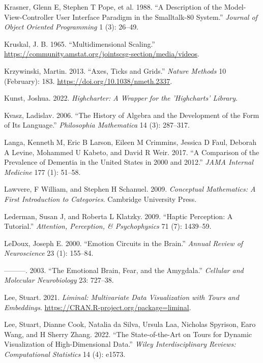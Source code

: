 \documentclass[
  openany]{book}
\newlength{\cslhangindent}
\newenvironment{CSLReferences}[2] %
 {\begin{list}{}{%
  \setlength{\itemindent}{0pt}
  \setlength{\leftmargin}{0pt}
  \setlength{\parsep}{0pt}
  \ifodd #1
   \setlength{\leftmargin}{\cslhangindent}
   \setlength{\itemindent}{-1\cslhangindent}
  \fi
  \setlength{\itemsep}{#2\baselineskip}}}
 {\end{list}}
\theoremstyle{definition}
\theoremstyle{definition}
\theoremstyle{definition}
\theoremstyle{definition}
\theoremstyle{remark}
\begin{document}
\begin{CSLReferences}{1}{0}
Krasner, Glenn E, Stephen T Pope, et al. 1988. {``A Description of the Model-View-Controller User Interface Paradigm in the Smalltalk-80 System.''} \emph{Journal of Object Oriented Programming} 1 (3): 26--49.

Kruskal, J. B. 1965. {``{Multidimensional Scaling}.''} \url{https://community.amstat.org/jointscsg-section/media/videos}.

Krzywinski, Martin. 2013. {``Axes, Ticks and Grids.''} \emph{Nature Methods} 10 (February): 183. \url{https://doi.org/10.1038/nmeth.2337}.

Kunst, Joshua. 2022. \emph{Highcharter: A Wrapper for the 'Highcharts' Library}.

Kvasz, Ladislav. 2006. {``The History of Algebra and the Development of the Form of Its Language.''} \emph{Philosophia Mathematica} 14 (3): 287--317.

Langa, Kenneth M, Eric B Larson, Eileen M Crimmins, Jessica D Faul, Deborah A Levine, Mohammed U Kabeto, and David R Weir. 2017. {``A Comparison of the Prevalence of Dementia in the United States in 2000 and 2012.''} \emph{JAMA Internal Medicine} 177 (1): 51--58.

Lawvere, F William, and Stephen H Schanuel. 2009. \emph{Conceptual Mathematics: A First Introduction to Categories}. Cambridge University Press.

Lederman, Susan J, and Roberta L Klatzky. 2009. {``Haptic Perception: A Tutorial.''} \emph{Attention, Perception, \& Psychophysics} 71 (7): 1439--59.

LeDoux, Joseph E. 2000. {``Emotion Circuits in the Brain.''} \emph{Annual Review of Neuroscience} 23 (1): 155--84.

---------. 2003. {``The Emotional Brain, Fear, and the Amygdala.''} \emph{Cellular and Molecular Neurobiology} 23: 727--38.

Lee, Stuart. 2021. \emph{Liminal: Multivariate Data Visualization with Tours and Embeddings}. \url{https://CRAN.R-project.org/package=liminal}.

Lee, Stuart, Dianne Cook, Natalia da Silva, Ursula Laa, Nicholas Spyrison, Earo Wang, and H Sherry Zhang. 2022. {``The State-of-the-Art on Tours for Dynamic Visualization of High-Dimensional Data.''} \emph{Wiley Interdisciplinary Reviews: Computational Statistics} 14 (4): e1573.


\end{CSLReferences}
\end{document}
